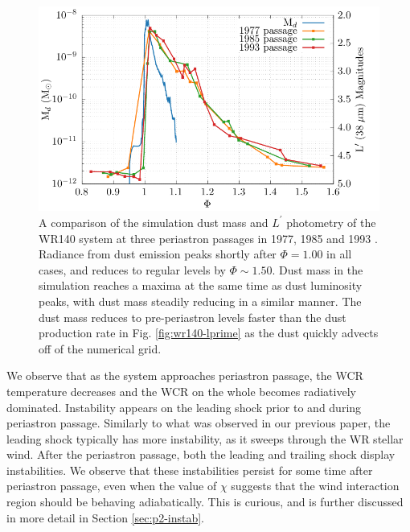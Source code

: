 \begin{figure}
  \centering
  \includegraphics{assets/fluxes/magnitudes-mass.pdf}
  \caption[Comparison of simulation dust mass and $L^\prime$ photometry]{A comparison of the simulation dust mass and $L^\prime$ photometry of the WR140 system at three periastron passages in 1977, 1985 and 1993 \parencite{crowther_dust_2003}. Radiance from dust emission peaks shortly after $\Phi = 1.00$ in all cases, and reduces to regular levels by $\Phi \sim 1.50$. Dust mass in the simulation reaches a maxima at the same time as dust luminosity peaks, with dust mass steadily reducing in a similar manner. The dust mass reduces to pre-periastron levels faster than the dust production rate in Fig. \ref{fig:wr140-lprime} as the dust quickly advects off of the numerical grid.}
  \label{fig:wr140-lprime-mass}
\end{figure}

We observe that as the system approaches periastron passage, the WCR temperature decreases and the WCR on the whole becomes radiatively dominated.
Instability appears on the leading shock prior to and during periastron passage.
Similarly to what was observed in our previous paper, the leading shock typically has more instability, as it sweeps through the WR stellar wind.
After the periastron passage, both the leading and trailing shock display instabilities.
We observe that these instabilities persist for some time after periastron passage, even when the value of $\chi$ suggests that the wind interaction region should be behaving adiabatically.
This is curious, and is further discussed in more detail in Section \ref{sec:p2-instab}.

